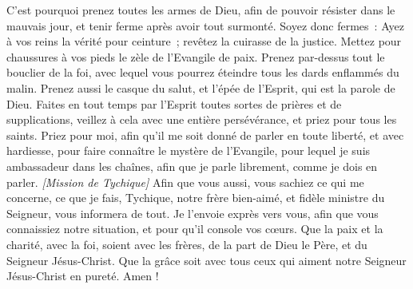 \begin{multicols}{2}
C'est pourquoi prenez toutes les armes de Dieu, afin de pouvoir résister dans le mauvais jour, et tenir ferme après avoir tout surmonté.
Soyez donc fermes : Ayez à vos reins la vérité pour ceinture ; revêtez la cuirasse de la justice.
Mettez pour chaussures à vos pieds le zèle de l'Evangile de paix.
Prenez par-dessus tout le bouclier de la foi, avec lequel vous pourrez éteindre tous les dards enflammés du malin.
Prenez aussi le casque du salut, et l'épée de l'Esprit, qui est la parole de Dieu.
Faites en tout temps par l’Esprit toutes sortes de prières et de supplications, veillez à cela avec une entière persévérance, et priez pour tous les saints.
Priez pour moi, afin qu'il me soit donné de parler en toute liberté, et avec hardiesse, pour faire connaître le mystère de l'Evangile,
pour lequel je suis ambassadeur dans les chaînes, afin que je parle librement, comme je dois en parler.
\textit{[Mission de Tychique]}
Afin que vous aussi, vous sachiez ce qui me concerne, ce que je fais, Tychique, notre frère bien-aimé, et fidèle ministre du Seigneur, vous informera de tout.
Je l’envoie exprès vers vous, afin que vous connaissiez notre situation, et pour qu'il console vos cœurs.
Que la paix et la charité, avec la foi, soient avec les frères, de la part de Dieu le Père, et du Seigneur Jésus-Christ.
Que la grâce soit avec tous ceux qui aiment notre Seigneur Jésus-Christ en pureté. Amen !
\PPE{}
\end{multicols}
